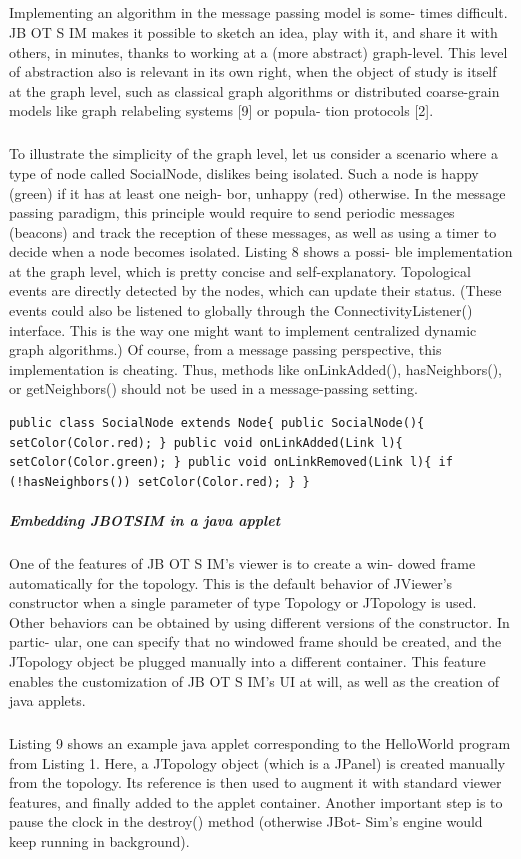 \subparagraph{}Implementing an algorithm in the message passing model is some- times difficult. JB OT S IM makes it possible to sketch an idea, play with it, and share it with others, in minutes, thanks to working at a (more abstract) graph-level. This level of abstraction also is relevant in its own right, when the object of study is itself at the graph level, such as classical graph algorithms or distributed coarse-grain models like graph relabeling systems [9] or popula- tion protocols [2].
\subparagraph{}To illustrate the simplicity of the graph level, let us consider a scenario where a type of node called SocialNode, dislikes being isolated. Such a node is happy (green) if it has at least one neigh- bor, unhappy (red) otherwise. In the message passing paradigm, this principle would require to send periodic messages (beacons) and track the reception of these messages, as well as using a timer to decide when a node becomes isolated. Listing 8 shows a possi- ble implementation at the graph level, which is pretty concise and self-explanatory. Topological events are directly detected by the nodes, which can update their status. (These events could also be listened to globally through the ConnectivityListener() interface. This is the way one might want to implement centralized dynamic graph algorithms.) Of course, from a message passing perspective, this implementation is cheating. Thus, methods like onLinkAdded(), hasNeighbors(), or getNeighbors() should not be used in a message-passing setting.

\begin{lstlisting}
public class SocialNode extends Node{ public SocialNode(){ setColor(Color.red); } public void onLinkAdded(Link l){ setColor(Color.green); } public void onLinkRemoved(Link l){ if (!hasNeighbors()) setColor(Color.red); } }
\end{lstlisting}
\subparagraph{Embedding JBOTSIM in a java applet}One of the features of JB OT S IM’s viewer is to create a win- dowed frame automatically for the topology. This is the default behavior of JViewer’s constructor when a single parameter of type Topology or JTopology is used. Other behaviors can be obtained by using different versions of the constructor. In partic- ular, one can specify that no windowed frame should be created, and the JTopology object be plugged manually into a different container. This feature enables the customization of JB OT S IM’s UI at will, as well as the creation of java applets.
\subparagraph{}Listing 9 shows an example java applet corresponding to the HelloWorld program from Listing 1. Here, a JTopology object (which is a JPanel) is created manually from the topology. Its reference is then used to augment it with standard viewer features, and finally added to the applet container. Another important step is to pause the clock in the destroy() method (otherwise JBot- Sim’s engine would keep running in background).


